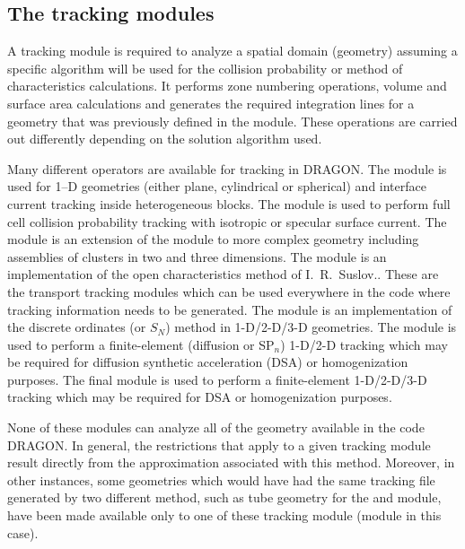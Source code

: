 \subsection{The tracking modules}\label{sect:TRKData}

A tracking module is required to analyze a spatial domain (geometry) assuming
a specific algorithm will be used for the collision probability or method of characteristics
calculations.  It performs zone numbering operations, volume and surface area
calculations and generates the required  integration lines for a geometry that
was previously defined in the  module. These operations are carried
out differently depending on the solution algorithm used.

\vskip 0.15cm

Many different operators are available for tracking in DRAGON. The  module
is used for 1--D geometries (either plane, cylindrical or spherical) and
interface current tracking inside heterogeneous blocks. The  module
is used to perform full cell collision probability tracking with
isotropic\cite{DragonPIJI,Mtl93a} or specular\cite{DragonPIJS1,Mtl93b}
surface current. The  module is an extension of the 
module to more complex geometry including assemblies of clusters in two and
three dimensions.\cite{ige260}  The  module is an implementation of the open
characteristics method of I.~R.~Suslov.\cite{mccg,suslov2}. These are the transport
tracking modules which can be used everywhere in the code where tracking
information needs to be generated. The  module is an implementation of
the discrete ordinates (or $S_N$) method in 1-D/2-D/3-D geometries.
The module  is used to perform a finite-element (diffusion or SP$_n$) 1-D/2-D
tracking which may be required for diffusion synthetic acceleration (DSA) or homogenization
purposes.\cite{BIVAC} The final module  is used to perform a finite-element
1-D/2-D/3-D tracking which may be required for DSA or homogenization purposes.\cite{TRIVAC}

\vskip 0.15cm

None of these modules can analyze all of the geometry available in the code
DRAGON. In general, the restrictions that apply to a given tracking module
result directly from the approximation associated with this method. Moreover, in
other instances, some geometries which would have had the same tracking file
generated by two different method, such as tube geometry for the 
and  module, have been made available only to one of these tracking
module (module  in this case).

